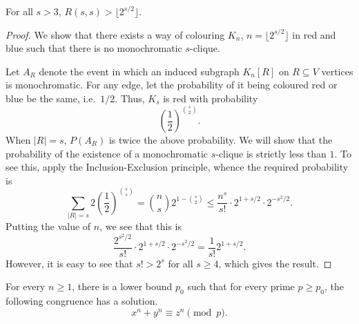 \documentclass[11pt]{article}
\theoremstyle{definition}
\theoremstyle{remark}
\numberwithin{equation}{section}
\begin{document}
    \begin{theorem}[Erd\H{o}s]
        For all $s > 3$, $R(s, s) > \lfloor 2^{s / 2}\rfloor$.
    \end{theorem}
    \begin{proof}
        We show that there exists a way of colouring $K_n$, $n = \lfloor 2^{s /
        2}\rfloor$ in red and blue such that there is no monochromatic $s$-clique.

        Let $A_R$ denote the event in which an induced subgraph $K_n[R]$ on $R
        \subseteq V$ vertices is monochromatic. For any edge, let the probability of
        it being coloured red or blue be the same, i.e.\ $1 / 2$. Thus, $K_s$ is
        red with probability \[
            \left(\frac{1}{2}\right)^{\binom{s}{2}}.
        \] When $|R| = s$, $P(A_R)$ is twice the above probability. We will show that
        the probability of the existence of a monochromatic $s$-clique is strictly
        less than $1$. To see this, apply the Inclusion-Exclusion principle, whence
        the required probability is \[
            \sum_{|R| = s} 2\left(\frac{1}{2}\right)^{\binom{s}{s}} = \binom{n}{s}
            2^{1 - \binom{s}{2}} \leq \frac{n^s}{s!}\cdot 2^{1 + s / 2} \cdot2^{-s^2
            / 2}.
        \] Putting the value of $n$, we see that this is \[
            \frac{2^{s^2 / 2}}{s!} \cdot 2^{1 + s / 2} \cdot2^{-s^2 / 2} =
            \frac{1}{s!}2^{1 + s / 2}.
        \] However, it is easy to see that $s! > 2^s$ for all $s \geq 4$, which gives
        the result.
    \end{proof}

    \begin{theorem}
        For every $n \geq 1$, there is a lower bound $p_0$ such that for every prime
        $p \geq p_0$, the following congruence has a solution. \[
            x^n + y^n \equiv z^n \pmod{p}.
        \] 
    \end{theorem}
\end{document}
